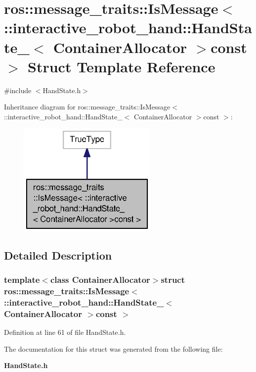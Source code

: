 \section{ros\-:\-:message\-\_\-traits\-:\-:Is\-Message$<$ \-:\-:interactive\-\_\-robot\-\_\-hand\-:\-:Hand\-State\-\_\-$<$ Container\-Allocator $>$const $>$ Struct Template Reference}
\label{structros_1_1message__traits_1_1IsMessage_3_01_1_1interactive__robot__hand_1_1HandState___3_01Coff2e1fc790e9fdff3e5184960f1dfe12}


{\ttfamily \#include $<$Hand\-State.\-h$>$}



Inheritance diagram for ros\-:\-:message\-\_\-traits\-:\-:Is\-Message$<$ \-:\-:interactive\-\_\-robot\-\_\-hand\-:\-:Hand\-State\-\_\-$<$ Container\-Allocator $>$const $>$\-:
\nopagebreak
\begin{figure}[H]
\begin{center}
\leavevmode
\includegraphics[width=192pt]{structros_1_1message__traits_1_1IsMessage_3_01_1_1interactive__robot__hand_1_1HandState___3_01Co8f7ec3ed6f6d28a521dd1e29fe2b9385}
\end{center}
\end{figure}


\subsection{Detailed Description}
\subsubsection*{template$<$class Container\-Allocator$>$struct ros\-::message\-\_\-traits\-::\-Is\-Message$<$ \-::interactive\-\_\-robot\-\_\-hand\-::\-Hand\-State\-\_\-$<$ Container\-Allocator $>$const  $>$}



Definition at line 61 of file Hand\-State.\-h.



The documentation for this struct was generated from the following file\-:\begin{DoxyCompactItemize}
\item 
{\bf Hand\-State.\-h}\end{DoxyCompactItemize}
